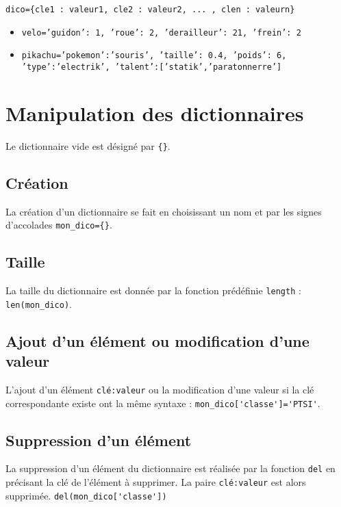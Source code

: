 \begin{center}
\texttt{dico=\{cle1 : valeur1, cle2 : valeur2, ... , clen : valeurn\}}
\end{center}

\begin{exemple}
\begin{itemize}
\item \texttt{velo={'guidon': 1, 'roue': 2, 'derailleur': 21, 'frein': 2}}
\item \texttt{pikachu={'pokemon':'souris', 'taille': 0.4, 'poids': 6, 'type':'electrik', 'talent':['statik','paratonnerre']}}
\end{itemize}
\end{exemple}

\section{Manipulation des dictionnaires}
Le dictionnaire vide est désigné par \texttt{\{\}}.
\subsection*{Création}
La création d'un dictionnaire se fait en choisissant un nom et par les signes d'accolades
\texttt{mon\_dico=\{\}}.

\subsection*{Taille}
La taille du dictionnaire est donnée par la fonction prédéfinie \lstinline{length} : 
\lstinline{len(mon_dico)}.


\subsection*{Ajout d'un élément ou modification d'une valeur}
L'ajout d'un élément \lstinline{clé:valeur} ou la modification d'une valeur si la clé correspondante existe ont la même syntaxe : \lstinline{mon_dico['classe']='PTSI'}. 

\subsection*{Suppression d'un élément}
La suppression d'un élément du dictionnaire est réalisée par la fonction \lstinline{del} en précisant la clé de l'élément à supprimer. La paire \lstinline{clé:valeur} est alors supprimée.
\lstinline{del(mon_dico['classe'])}



